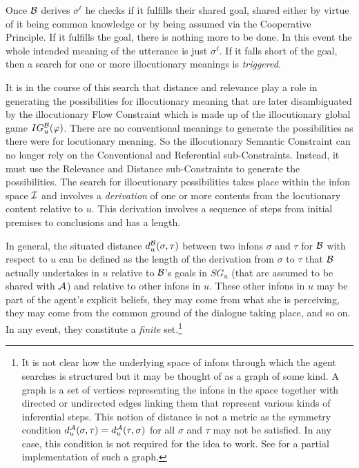 Once $\cal B$ derives $\sigma^{\ell}$ he checks if it fulfills their shared goal, shared either by virtue of it being common knowledge or by being assumed via the Cooperative Principle. If it fulfills the goal, there is nothing more to be done. In this event the whole intended meaning of the utterance is just $\sigma^{\ell}$. If it falls short of the goal, then a search for one or more illocutionary meanings is \emph{triggered}.

It is in the course of this search that distance and relevance play a role in generating the possibilities for illocutionary meaning that are later disambiguated by the illocutionary Flow Constraint which is made up of the illocutionary global game $IG^{\cal B}_u(\varphi)$. There are no conventional meanings to generate the possibilities as there were for locutionary meaning. So the illocutionary Semantic Constraint can no longer rely on the Conventional and Referential sub-Constraints. Instead, it must use the Relevance and Distance sub-Constraints to generate the possibilities. The search for illocutionary possibilities takes place within the infon space $\cal I$ and involves a \emph{derivation} of one or more contents from the locutionary content relative to $u$. This derivation involves a sequence of steps from initial premises to conclusions and has a length.

In general, the situated distance $d^{\cal B}_u(\sigma, \tau)$ between two infons $\sigma$ and $\tau$ for $\cal B$ with respect to $u$ can be defined as the length of the derivation from $\sigma$ to $\tau$ that $\cal B$ actually undertakes in $u$ relative to $\cal B$'s goals in $SG_u$ (that are assumed to be shared with $\cal A$) and relative to other infons in $u$. These other infons in $u$ may be part of the agent's explicit beliefs, they may come from what she is perceiving, they may come from the common ground of the dialogue taking place, and so on. In any event, they constitute a \emph{finite} set.\footnote{It is not clear how the underlying space of infons through which the agent searches is structured but it may be thought of as a graph of some kind. A graph is a set of vertices representing the infons in the space together with directed or undirected edges linking them that represent various kinds of inferential steps. This notion of distance is not a metric as the symmetry condition $d^{\cal A}_u(\sigma, \tau) = d^{\cal A}_u(\tau, \sigma)$ for all $\sigma$ and $\tau$ may not be satisfied. In any case, this condition is not required for the idea to work. See \citet[Section~3]{be:iii} for a partial implementation of such a graph.}


